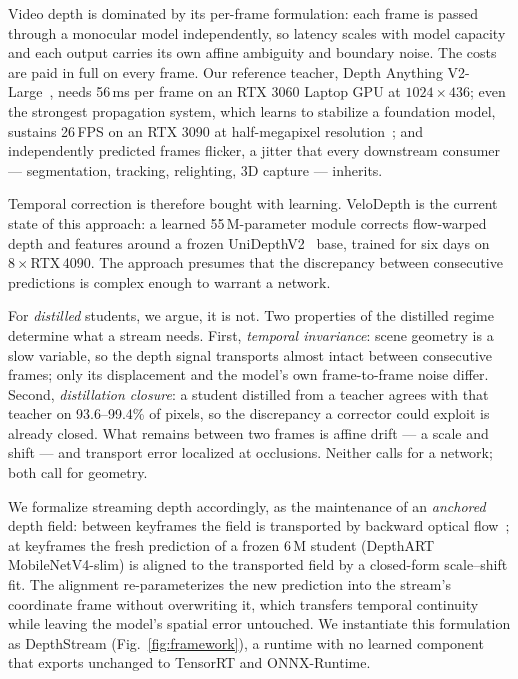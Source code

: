 \documentclass[10pt,twocolumn]{article}
\begin{document}
Video depth is dominated by its per-frame formulation: each frame is passed
through a monocular model independently, so latency scales with model
capacity and each output carries its own affine ambiguity and boundary
noise. The costs are paid in full on every frame. Our reference teacher,
Depth Anything V2-Large~\cite{dav2}, needs 56\,ms per frame on an RTX 3060
Laptop GPU at $1024{\times}436$; even the strongest propagation system,
which learns to stabilize a foundation model, sustains 26\,FPS on an RTX
3090 at half-megapixel resolution~\cite{velodepth}; and independently
predicted frames flicker, a jitter that every downstream consumer ---
segmentation, tracking, relighting, 3D capture --- inherits.

Temporal correction is therefore bought with learning. VeloDepth
\cite{velodepth} is the current state of this approach: a learned
55\,M-parameter module corrects flow-warped depth and features around a
frozen UniDepthV2~\cite{unidepth} base, trained for six days on
$8\times$RTX\,4090. The approach presumes that the discrepancy between
consecutive predictions is complex enough to warrant a network.

For \emph{distilled} students, we argue, it is not. Two properties of the
distilled regime determine what a stream needs. First, \emph{temporal
invariance}: scene geometry is a slow variable, so the depth signal
transports almost intact between consecutive frames; only its displacement
and the model's own frame-to-frame noise differ. Second, \emph{distillation
closure}: a student distilled from a teacher agrees with that teacher on
93.6--99.4\% of pixels, so the discrepancy a corrector could exploit is
already closed. What remains between two frames is affine drift --- a
scale and shift --- and transport error localized at occlusions. Neither
calls for a network; both call for geometry.

We formalize streaming depth accordingly, as the maintenance of an
\emph{anchored} depth field: between keyframes the field is transported by
backward optical flow~\cite{disflow}; at keyframes the fresh prediction of
a frozen 6\,M student (DepthART~\cite{depthart} MobileNetV4-slim) is
aligned to the transported field by a closed-form scale--shift fit. The
alignment re-parameterizes the new prediction into the stream's coordinate
frame without overwriting it, which transfers temporal continuity while
leaving the model's spatial error untouched. We instantiate this
formulation as DepthStream (Fig.~\ref{fig:framework}), a runtime with no
learned component that exports unchanged to TensorRT and ONNX-Runtime.
\end{document}
